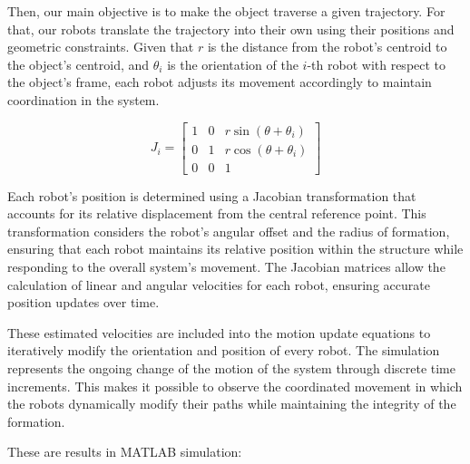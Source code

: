 Then, our main objective is to make the object traverse a given trajectory. For that, our robots translate the trajectory into their own using their positions and geometric constraints. Given that \( r \) is the distance from the robot's centroid to the object's centroid, and \( \theta_i \) is the orientation of the \( i \)-th robot with respect to the object's frame, each robot adjusts its movement accordingly to maintain coordination in the system.

\[
J_i =
\begin{bmatrix}
1 & 0 & r \sin(\theta + \theta_i) \\
0 & 1 & r \cos(\theta + \theta_i) \\
0 & 0 & 1
\end{bmatrix}
\]

Each robot's position is determined using a Jacobian transformation that accounts for its relative displacement from the central reference point. This transformation considers the robot's angular offset and the radius of formation, ensuring that each robot maintains its relative position within the structure while responding to the overall system's movement. The Jacobian matrices allow the calculation of linear and angular velocities for each robot, ensuring accurate position updates over time.

These estimated velocities are included into the motion update equations to iteratively modify the orientation and position of every robot. The simulation represents the ongoing change of the motion of the system through discrete time increments. This makes it possible to observe the coordinated movement in which the robots dynamically modify their paths while maintaining the integrity of the formation.

These are results in MATLAB simulation:

